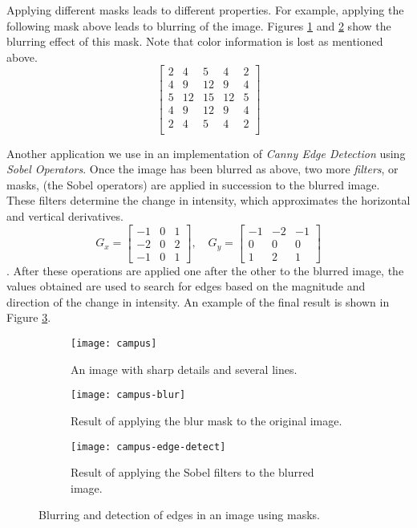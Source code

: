 \documentclass[addpoints]{exam}
\begin{document}
Applying different masks leads to different properties. For example, applying the following mask above leads to blurring of the image. Figures \ref{fig:mask-orig} and \ref{fig:mask-blur} show the blurring effect of this mask. Note that color information is lost as mentioned above.
\[
  \left[
    \begin{array}{ccccc}
      2 & 4 & 5 & 4 & 2\\
      4 & 9 & 12 & 9 & 4\\
      5 & 12 & 15 & 12 & 5\\
      4 & 9 & 12 & 9 & 4\\
      2 & 4 & 5 & 4 & 2\\
    \end{array}          
  \right]
\]

Another application we use in an implementation of \textit{Canny Edge Detection} using \textit{Sobel Operators}. Once the image has been blurred as above, two more \textit{filters}, or masks, (the Sobel operators) are applied in succession to the blurred image. These filters determine the change in intensity, which approximates the horizontal and vertical derivatives.
\[
  G_x =   \left[
    \begin{array}{ccc}
      -1 & 0 & 1\\
      -2 & 0 & 2\\
      -1 & 0 & 1
    \end{array}
      \right], \quad
  G_y =   \left[
    \begin{array}{ccc}
      -1 & -2 & -1\\
      0 & 0 & 0\\
      1 & 2 & 1
    \end{array}    
  \right]
\]
. After these operations are applied one after the other to the blurred image, the values obtained are used to search for edges based on the magnitude and direction of the change in intensity. An example of the final result is shown in Figure \ref{fig:mask-edge}.

\begin{figure}
  \centering
  \begin{subfigure}{.31\textwidth}
    \texttt{[image: campus]}
    \caption{An image with sharp details and several lines.}\label{fig:mask-orig}
  \end{subfigure}
  \begin{subfigure}[c]{.31\textwidth}
    \texttt{[image: campus-blur]}
    \caption{Result of applying the blur mask to the original image.}\label{fig:mask-blur}
  \end{subfigure}
  \begin{subfigure}[c]{.31\textwidth}
    \texttt{[image: campus-edge-detect]}
    \caption{Result of applying the Sobel filters to the blurred image.}\label{fig:mask-edge}
  \end{subfigure}
  \caption{Blurring and detection of edges in an image using masks.}
  \label{fig:mask-apply}
\end{figure}
\end{document}
